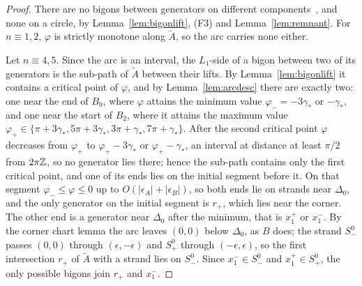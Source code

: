 \begin{proof}
There are no bigons between generators on different components~\cite[p.~37]{HHK2}, and none on a circle,
by Lemma~\ref{lem:bigonlift}, (F3) and Lemma~\ref{lem:remnant}. For $n\equiv1,2$, $\varphi$ is strictly monotone along
$\tilde A$, so the arc carries none either.

Let $n\equiv4,5$. Since the arc is an interval, the $L_1$-side of a bigon between two of its generators is the
sub-path of $\tilde A$ between their lifts. By Lemma~\ref{lem:bigonlift} it contains a critical point of $\varphi$,
and by Lemma~\ref{lem:arcdesc} there are exactly two: one near the end of $B_0$, where $\varphi$ attains the
minimum value $\varphi_-=-3\gamma_*$ or $-\gamma_*$, and one near the start of $B_2$, where it attains the maximum
value $\varphi_+\in\{\pi+3\gamma_*,5\pi+3\gamma_*,3\pi+\gamma_*,7\pi+\gamma_*\}$. After the second critical point $\varphi$ decreases
from $\varphi_+$ to $\varphi_+-3\gamma_*$ or $\varphi_+-\gamma_*$, an interval at distance at least $\pi/2$ from $2\pi\mathbb{Z}$, so no generator
lies there; hence the sub-path contains only the first critical point, and one of its ends lies on the
initial segment before it. On that segment $\varphi_-\le\varphi\le0$ up to $O(|\epsilon_A|+|\epsilon_B|)$, so both ends lie on strands near
$\Delta_0$, and the only generator on the initial segment is $r_+$, which lies near the corner. The other end is a generator near $\Delta_0$ after the
minimum, that is $x_1^+$ or $x_1^-$. By the corner chart lemma the arc leaves $(0,0)$ below $\Delta_0$, as $B$ does;
the strand $S^0_-$ passes $(0,0)$ through $(\epsilon,-\epsilon)$ and $S^0_+$ through $(-\epsilon,\epsilon)$, so the first
intersection $r_+$ of $\tilde A$ with a strand lies on $S^0_-$. Since $x_1^-\in S^0_-$ and $x_1^+\in S^0_+$, the only
possible bigons join $r_+$ and $x_1^-$.


\end{proof}
